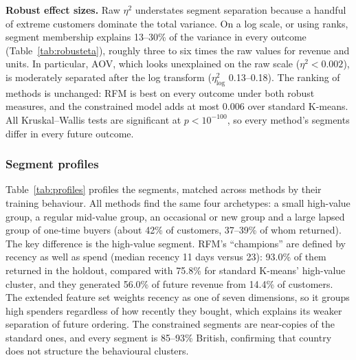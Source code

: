 \documentclass[conference,10pt]{IEEEtran}
\newcommand{\etasq}{\eta^{2}}
\begin{document}
\textbf{Robust effect sizes.} Raw $\etasq$ understates segment separation
because a handful of extreme customers dominate the total variance. On a log
scale, or using ranks, segment membership explains 13--30\% of the variance in
every outcome (Table~\ref{tab:robusteta}), roughly three to six times the raw
values for revenue and units. In particular, AOV, which looks unexplained on the raw
scale ($\etasq<0.002$), is moderately separated after the log transform
($\etasq_{\log}$ 0.13--0.18). The ranking of methods is unchanged: RFM is best
on every outcome under both robust measures, and the constrained model adds
at most 0.006 over standard K-means. All Kruskal--Wallis tests are
significant at $p<10^{-100}$, so every method's segments differ in every
future outcome.

\subsubsection*{Segment profiles}
Table~\ref{tab:profiles} profiles the segments, matched across methods by
their training behaviour. All methods find the same four archetypes: a small
high-value group, a regular mid-value group, an occasional or new group and
a large lapsed group of one-time buyers (about 42\% of customers, 37--39\%
of whom returned). The key difference is the high-value segment. RFM's
``champions'' are defined by recency as well as spend (median recency 11 days
versus 23): 93.0\% of them returned in the holdout, compared with 75.8\% for
standard K-means' high-value cluster, and they generated 56.0\% of future
revenue from 14.4\% of customers. The extended feature set weights recency
as one of seven dimensions, so it groups high spenders regardless of how
recently they bought, which explains its weaker separation of future
ordering. The constrained segments are near-copies of the standard ones, and
every segment is 85--93\% British, confirming that country does not structure
the behavioural clusters.
\end{document}
